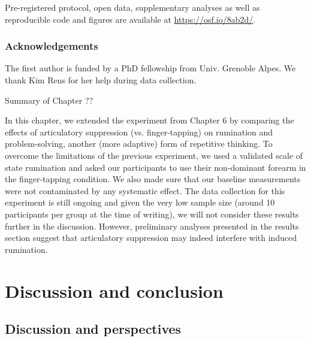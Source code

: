 \documentclass[a4paper,12pt,twoside,onecolumn,openright,final,oldfontcommands]{memoir}
\newcommand\getcurrentref[1]{
 \ifnumequal{\value{#1}}{0}
  {??}
  {\the\value{#1}}
}
\begin{document}
Pre-registered protocol, open data, supplementary analyses as well as reproducible code and figures are available at \url{https://osf.io/8ab2d/}.

\hypertarget{acknowledgements-4}{%
\section{Acknowledgements}\label{acknowledgements-4}}

The first author is funded by a PhD fellowship from Univ. Grenoble Alpes. We thank Kim Rens for her help during data collection.

\newpage

\begin{vplace}[1]

\begin{summary}{Summary of Chapter\getcurrentref{chapter}}

In this chapter, we extended the experiment from Chapter 6 by comparing the effects of articulatory suppression (vs. finger-tapping) on rumination and problem-solving, another (more adaptive) form of repetitive thinking. To overcome the limitations of the previous experiment, we used a validated scale of state rumination and asked our participants to use their non-dominant forearm in the finger-tapping condition. We also made sure that our baseline measurements were not contaminated by any systematic effect. The data collection for this experiment is still ongoing and given the very low sample size (around 10 participants per group at the time of writing), we will not consider these results further in the discussion. However, preliminary analyses presented in the results section suggest that articulatory suppression may indeed interfere with induced rumination.

\end{summary}

\end{vplace}

\hypertarget{part-discussion-and-conclusion}{%
\part{Discussion and conclusion}\label{part-discussion-and-conclusion}}

\hypertarget{chap8}{%
\chapter{Discussion and perspectives}\label{chap8}}
\end{document}
